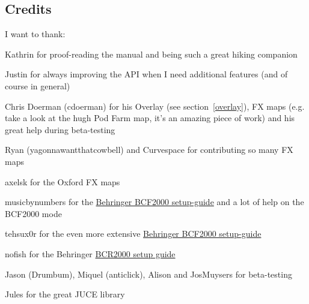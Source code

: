 \subsection{Credits}
I want to thank:
\begin{compactitem}
\item Kathrin for proof-reading the manual and being such a great
  hiking companion
\item Justin for always improving the \reaper API when I need
  additional features (and of course \reaper in general)
\item Chris Doerman (cdoerman) for his Overlay (see
  section~\ref{overlay}), FX maps (e.g. take a look at the hugh Pod
  Farm map, it's an amazing piece of work) and his great help during
  beta-testing
\item Ryan (yagonnawantthatcowbell) and Curvespace for contributing so
  many FX maps
\item axelsk for the Oxford FX maps
\item musicbynumbers for the
  \href{http://forum.cockos.com/showpost.php?p=473466&postcount=127}{Behringer
    BCF2000 setup-guide} and a lot of help on the BCF2000 mode
\item tehsux0r for the even more extensive
  \href{http://forum.cockos.com/showthread.php?t=117909}{Behringer
    BCF2000 setup-guide}
\item nofish for the Behringer
  \href{http://forum.cockos.com/showthread.php?t=60110}{BCR2000
    setup guide}
\item Jason (Drumbum), Miquel (anticlick), Alison and JosMuysers for
beta-testing
\item Jules for the great JUCE library
\end{compactitem}

